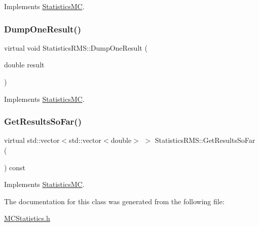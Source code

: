 Implements \hyperlink{classStatisticsMC_af716d17e088d36f283e112ba736f8002}{Statistics\+MC}.

\hypertarget{classStatisticsRMS_af9c972ac6ee7938f6690a99ee51b5771}{}\label{classStatisticsRMS_af9c972ac6ee7938f6690a99ee51b5771} 
\subsubsection{\texorpdfstring{Dump\+One\+Result()}{DumpOneResult()}}
{\footnotesize\ttfamily virtual void Statistics\+R\+M\+S\+::\+Dump\+One\+Result (\begin{DoxyParamCaption}\item[{double}]{result }\end{DoxyParamCaption})\hspace{0.3cm}{\ttfamily [virtual]}}



Implements \hyperlink{classStatisticsMC_a3ab5fb27d6933d8e35b2a55c3897cbe3}{Statistics\+MC}.

\hypertarget{classStatisticsRMS_a7c6b6ca7df8fac1cbfb16bca6272445b}{}\label{classStatisticsRMS_a7c6b6ca7df8fac1cbfb16bca6272445b} 
\subsubsection{\texorpdfstring{Get\+Results\+So\+Far()}{GetResultsSoFar()}}
{\footnotesize\ttfamily virtual std\+::vector$<$std\+::vector$<$double$>$ $>$ Statistics\+R\+M\+S\+::\+Get\+Results\+So\+Far (\begin{DoxyParamCaption}{ }\end{DoxyParamCaption}) const\hspace{0.3cm}{\ttfamily [virtual]}}



Implements \hyperlink{classStatisticsMC_ae29a294b6db36c2bf46c20ac30e25aad}{Statistics\+MC}.



The documentation for this class was generated from the following file\+:\begin{DoxyCompactItemize}
\item 
\hyperlink{MCStatistics_8h}{M\+C\+Statistics.\+h}\end{DoxyCompactItemize}
